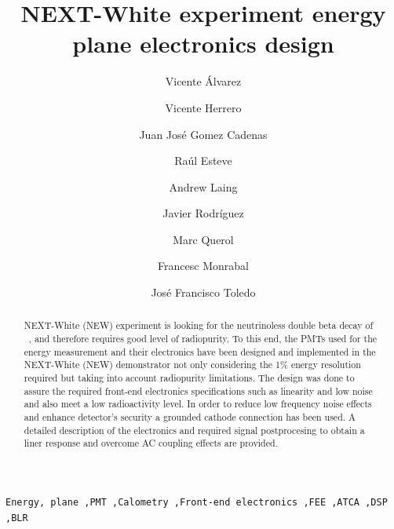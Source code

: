 \documentclass[a4paper, 10pt, oneside, twocolumn, 3p]{elsarticle}
\begin{document}
\setlength{\parskip}{4mm}
\sloppy {}

\begin{frontmatter}

\title{NEXT-White experiment energy plane electronics design}

\author[mymainaddress]{Vicente \'Alvarez} 
\author[mysecondaryaddress]{Vicente Herrero}
\author[mymainaddress]{Juan Jos\'e Gomez Cadenas} 
\author[mysecondaryaddress]{Ra\'ul Esteve} 
\author[mysecondaryaddress]{Andrew Laing} 
\author[mysecondaryaddress]{Javier Rodríguez} 
\author[mymainaddress]{Marc Querol} 
\author[mysecondaryaddress2]{Francesc Monrabal} 
\author[mysecondaryaddress]{José Francisco Toledo} 

\address[mymainaddress]{Instituto de Física Corpuscular(IFIC), CSIC \& Universitat de València \\ Calle Catedrático José Beltrán, 2, 46980 Paterna, Valencia, Spain} 
\address[mysecondaryaddress]{Instituto de Instrumentación para Imagen Molecular (I3M), Universtitat Politècnica de València \\ Camino de vera, s/n, Edificio 8B, 46022 Valencia, Spain}
\address[mysecondaryaddress2]{Departament of Physics, University of Texas at Arlington\\ Arlington, Texas 76019, USA}

\begin{abstract}
NEXT-White (NEW) experiment is looking for the neutrinoless double beta decay of  \XE\ , and therefore requires good level of radiopurity. To this end, the PMTs used for the energy measurement and their electronics have been designed and implemented in the NEXT-White (NEW) demonstrator not only considering the 1\% energy resolution required but taking into account radiopurity limitations. The design was done to assure the required front-end electronics specifications such as linearity and low noise and also meet a low radioactivity level. In order to reduce low frequency noise effects and enhance detector's security a grounded cathode connection has been used. A detailed description of the electronics and required signal postprocesing to obtain a liner response and overcome AC coupling effects are provided.

\end{abstract}

\begin{keyword}

 \texttt{Energy, plane  \sep PMT \sep Calometry \sep Front-end electronics \sep FEE  \sep ATCA \sep DSP  \sep BLR}
 

\end{keyword}


\end{frontmatter}
\end{document}
